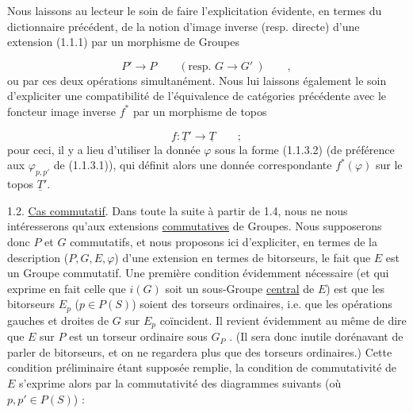 Nous laissons au lecteur le soin de faire l'explicitation évidente, en termes du dictionnaire précédent, de la notion d'image inverse (resp. directe) d'une extension (1.1.1) par un morphisme de Groupes

\begin{equation*}
P' \longrightarrow P \qquad (\text{resp. } G \longrightarrow G'\ ) \qquad ,
\end{equation*}
ou par ces deux opérations simultanément. Nous lui laissons également le soin d'expliciter une compatibilité de l'équivalence de catégories précédente avec le foncteur image inverse $f^*$ par un morphisme de topos

\begin{equation*}
f : \underline{T}' \longrightarrow \underline{T} \qquad ;
\end{equation*}
pour ceci, il y a lieu d'utiliser la donnée $\varphi$ sous la forme (1.1.3.2) (de préférence aux $\varphi_{p,p'}$ de (1.1.3.1)), qui définit alors une donnée correspondante $f^*(\varphi)$ sur le topos $\underline{T}'$.

1.2. \underline{Cas commutatif}. Dans toute la suite à partir de 1.4, nous ne nous intéresserons qu'aux extensions \underline{commutatives} de Groupes. Nous supposerons donc $P$ et $G$ commutatifs, et nous proposons ici d'expliciter, en termes
de la description ($P,G,E,\varphi$) d'une extension en termes de bitorseurs, le fait que $E$ est un Groupe commutatif. Une première condition évidemment nécessaire (et qui exprime en fait celle que $i(G)$ soit un sous-Groupe \underline{central} de $E$) est que les bitorseurs $E_p$ ($p \in P(S)$) soient des torseurs ordinaires, i.e. que les opérations gauches et droites de $G$ sur $E_p$ coïncident. Il revient évidemment au même de dire que $E$ sur $P$ est un torseur ordinaire sous $G_P$ . (Il sera donc inutile dorénavant de parler de bitorseurs, et on ne regardera plus que des torseurs ordinaires.) Cette condition préliminaire étant supposée remplie, la condition de commutativité de $E$ s'exprime alors par la commutativité des diagrammes suivants (où $p,p' \in P(S)$) :

